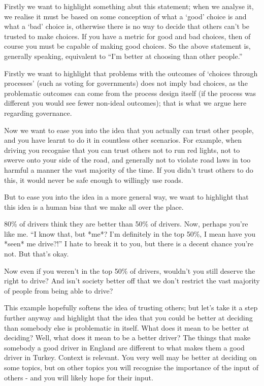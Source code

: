 \documentclass[twoside]{article}
\theoremstyle{definition}
\begin{document}
Firstly we want to highlight something abut this statement; when we analyse it, we realise it must be based on some conception of what a ‘good’ choice is and what a ‘bad’ choice is, otherwise there is no way to decide that others can’t be trusted to make choices. If you have a metric for good and bad choices, then of course you must be capable of making good choices. So the above statement is, generally speaking, equivalent to “I’m better at choosing than other people.”

Firstly we want to highlight that problems with the outcomes of ‘choices through processes’ (such as voting for governments) does not imply bad choices, as the problematic outcomes can come from the process design itself (if the process was different you would see fewer non-ideal outcomes); that is what we argue here regarding governance.

Now we want to ease you into the idea that you actually can trust other people, and you have learnt to do it in countless other scenarios. For example, when driving you recognise that you can trust others not to run red lights, not to swerve onto your side of the road, and generally not to violate road laws in too harmful a manner the vast majority of the time. If you didn’t trust others to do this, it would never be safe enough to willingly use roads.

But to ease you into the idea in a more general way, we want to highlight that this idea is a human bias that we make all over the place.

80\% of drivers think they are better than 50\% of drivers. Now, perhaps you’re like me. “I know that, but *me*? I’m definitely in the top 50\%, I mean have you *seen* me drive?!” I hate to break it to you, but there is a decent chance you’re not. But that’s okay.

Now even if you weren’t in the top 50\% of drivers, wouldn’t you still deserve the right to drive? And isn’t society better off that we don’t restrict the vast majority of people from being able to drive?

This example hopefully softens the idea of trusting others; but let’s take it a step further anyway and highlight that the idea that you could be better at deciding than somebody else is problematic in itself. What does it mean to be better at deciding? Well, what does it mean to be a better driver? The things that make somebody a good driver in England are different to what makes them a good driver in Turkey. Context is relevant. You very well may be better at deciding on some topics, but on other topics you will recognise the importance of the input of others - and you will likely hope for their input.
\end{document}
